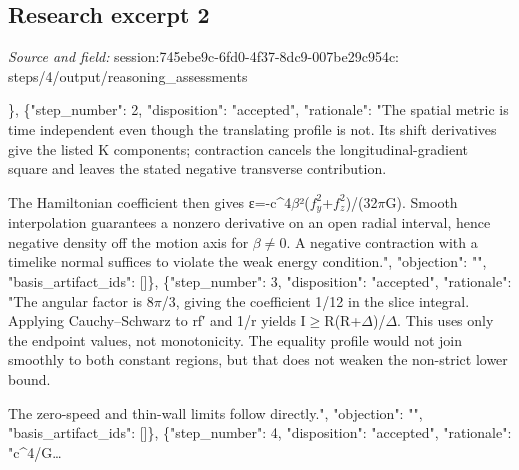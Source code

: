 \documentclass[11pt]{article}
\begin{document}
\subsection{Research excerpt 2}
\textit{Source and field: }session:745ebe9c-6fd0-4f37-8dc9-007be29c954c: steps/4/output/reasoning\_assessments\par
[\{"step\_number": 1, "disposition": "accepted", "rationale": "Accepted as the explicit premises of the conditional claim, not as an established physical realization. Substitution gives g(n,n)=-1, and the lapse, shift, and Euclidean spatial metric follow from the line element. The primary-source citation is expressly identified as uninspected rather than used as proof.", "objection": "", "basis\_artifact\_ids": []\}, \{"step\_number": 2, "disposition": "accepted", "rationale": "The spatial metric is time independent even though the translating profile is not. Its shift derivatives give the listed K components; contraction cancels the longitudinal-gradient square and leaves the stated negative transverse contribution.

The Hamiltonian coefficient then gives ε=-c\textasciicircum{}4$\beta$²($f_y^{2}$+$f_z^{2}$)/(32$\pi$G). Smooth interpolation guarantees a nonzero derivative on an open radial interval, hence negative density off the motion axis for $\beta$$\neq$0. A negative contraction with a timelike normal suffices to violate the weak energy condition.", "objection": "", "basis\_artifact\_ids": []\}, \{"step\_number": 3, "disposition": "accepted", "rationale": "The angular factor is 8$\pi$/3, giving the coefficient 1/12 in the slice integral. Applying Cauchy–Schwarz to rf′ and 1/r yields I$\geq$R(R+$\Delta$)/$\Delta$. This uses only the endpoint values, not monotonicity. The equality profile would not join smoothly to both constant regions, but that does not weaken the non-strict lower bound.

The zero-speed and thin-wall limits follow directly.", "objection": "", "basis\_artifact\_ids": []\}, \{"step\_number": 4, "disposition": "accepted", "rationale": "c\textasciicircum{}4/G…
\end{document}
